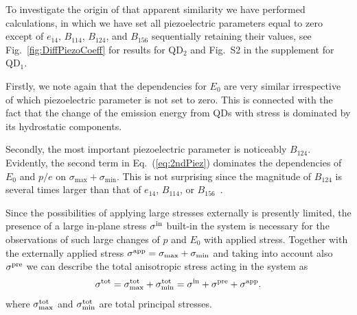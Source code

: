 \documentclass[aps,prl,amsmath,amssymb,twocolumn,showpacs,showkeys,superscriptaddress]{revtex4-1}
\begin{document}
To investigate the origin of that apparent similarity we have performed calculations, in which we have set all piezoelectric parameters equal to zero except of $e_{14}$, $B_{114}$, $B_{124}$, and $B_{156}$ sequentially retaining their values, see Fig.~\ref{fig:DiffPiezoCoeff} for results for QD$_2$ and Fig.~S2 in the supplement for QD$_1$. 


Firstly, we note again that the dependencies for $E_0$ are very similar irrespective of which piezoelectric parameter is not set to zero. This is connected with the fact that the change of the emission energy from QDs with stress is dominated by its hydrostatic components.

Secondly, the most important piezoelectric parameter is noticeably $B_{124}$. Evidently, the second term in Eq.~(\ref{eq:2ndPiez}) dominates the dependencies of $E_0$ and $p/e$ on $\sigma_{\mathrm{max}}+\sigma_{\mathrm{min}}$. This is not surprising since the magnitude of $B_{124}$ is several times larger than that of $e_{14}$, $B_{114}$, or $B_{156}$~\cite{Beya-Wakata2011}. 
%

Since the possibilities of applying large stresses externally is presently limited, the presence of a large in-plane stress $\sigma^{\rm{in}}$ built-in the system is necessary for the observations of such large changes of $p$ and $E_0$ with applied stress. Together with the externally applied stress $\sigma^{\rm{app}}=\sigma_{\mathrm{max}}+\sigma_{\mathrm{min}}$ and taking into account also $\sigma^{\rm{pre}}$ we can describe the total anisotropic stress acting in the system as 
%
%
%
%
%
%
\begin{equation}
\label{eq:stressTot}
\sigma^{\rm{tot}} = \sigma^{\rm{tot}}_{\mathrm{max}}+\sigma^{\rm{tot}}_{\mathrm{min}} = \sigma^{\rm{in}} + \sigma^{\rm{pre}} + \sigma^{\rm{app}}.
\end{equation}
%
where $\sigma^{\rm{tot}}_{\mathrm{max}}$ and $\sigma^{\rm{tot}}_{\mathrm{min}}$ are total principal stresses.
%
\end{document}
